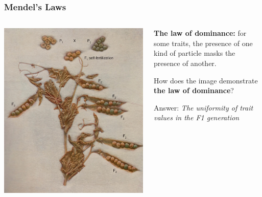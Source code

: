 \documentclass{beamer}
\begin{document}
\begin{frame}
	
	\frametitle{Mendel's Laws}
	\begin{columns}
		\begin{column}{0.6\textwidth}
			\includegraphics[keepaspectratio, width  =\textwidth]{img/crossedPeas}
			
		\end{column}
		\begin{column}{0.4\textwidth}
			\small	
			
			\textbf{The law of dominance: } for some traits, the presence of one kind of particle masks the presence of another.

			\vspace{10pt}
			
			How does the image demonstrate \textbf{the law of dominance}?  \pause
			
			\vspace{10pt}
			
			Answer: \textit{The uniformity of trait values in the F1 generation}
			
			
		\end{column}		
		
	\end{columns}
\end{frame}
\end{document}
